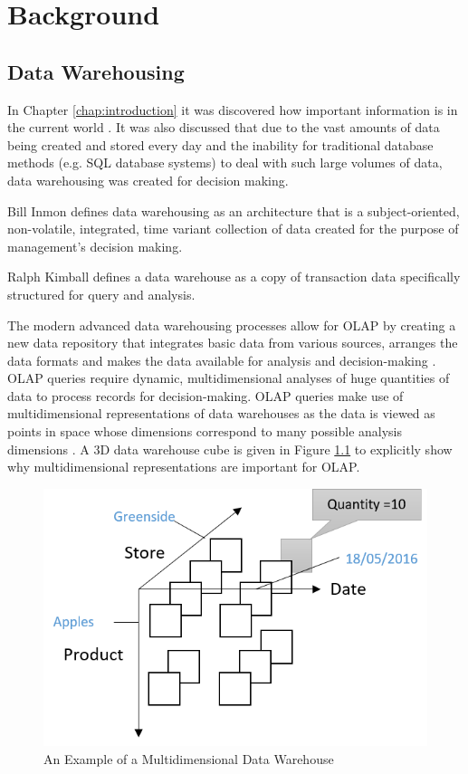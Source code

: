 %
%
%
%
%
\chapter{Background} \label{chap:background}
\vspace{-1cm}

\section{Data Warehousing}
In Chapter \ref{chap:introduction} it was discovered how important information is in the current world \cite{golfarelli:2009:dwd}. It was also discussed that due to the vast amounts of data being created and stored every day and the inability for traditional database methods (e.g. SQL database systems) to deal with such large volumes of data, data warehousing was created for decision making.

Bill Inmon defines data warehousing as an architecture that is a subject-oriented, non-volatile, integrated, time variant collection of data created for the purpose of management’s decision making. 

Ralph Kimball defines a data warehouse as a copy of transaction data specifically structured for query and analysis.

The modern advanced data warehousing processes allow for OLAP by creating a new data repository that integrates basic data from various sources, arranges the data formats and makes the data available for analysis and decision-making \cite{golfarelli:2009:dwd}. OLAP queries require dynamic, multidimensional analyses of huge quantities of data to process records for decision-making. OLAP queries make use of multidimensional representations of data warehouses as the data is viewed as points in space whose dimensions correspond to many possible analysis dimensions \cite{golfarelli:2009:dwd}. A 3D data warehouse cube is given in Figure \ref{fig:exampleCube} to explicitly show why multidimensional representations are important for OLAP.

 \begin{figure}[H]
	\centering
	\includegraphics[width=0.6\linewidth]{exampleCube}
	\caption{An Example of a Multidimensional Data Warehouse}
	\label{fig:exampleCube}
\end{figure}

